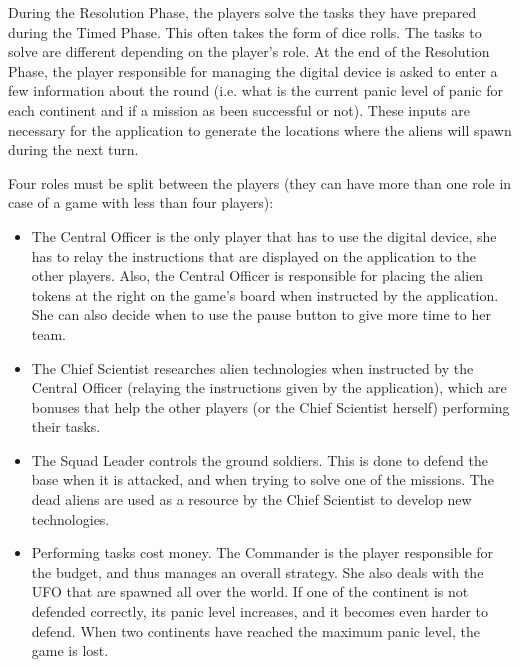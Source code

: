 During the Resolution Phase, the players solve the tasks they have prepared during the Timed Phase. This often takes the form of dice rolls. The tasks to solve are different depending on the player's role. At the end of the Resolution Phase, the player responsible for managing the digital device is asked to enter a few information about the round (i.e. what is the current panic level of panic for each continent and if a mission as been successful or not). These inputs are necessary for the application to generate the locations where the aliens will spawn during the next turn. 

Four roles must be split between the players (they can have more than one role in case of a game with less than four players):

\begin{itemize}
\label{sec:XCOM}
\item The Central Officer is the only player that has to use the digital device, she has to relay the instructions that are displayed on the application to the other players. Also, the Central Officer is responsible for placing the alien tokens at the right on the game's board when instructed by the application. She can also decide when to use the pause button to give more time to her team.
\item The Chief Scientist researches alien technologies when instructed by the Central Officer (relaying the instructions given by the application), which are bonuses that help the other players (or the Chief Scientist herself) performing their tasks.
\item The Squad Leader controls the ground soldiers. This is done to defend the base when it is attacked, and when trying to solve one of the missions. The dead aliens are used as a resource by the Chief Scientist to develop new technologies.
\item Performing tasks cost money. The Commander is the player responsible for the budget, and thus manages an overall strategy. She also deals with the UFO that are spawned all over the world. If one of the continent is not defended correctly, its panic level increases, and it becomes even harder to defend. When two continents have reached the maximum panic level, the game is lost.
\end{itemize}

